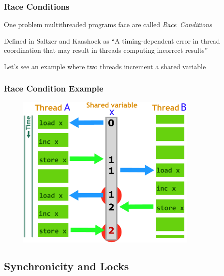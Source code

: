 \documentclass{beamer}
\newcommand{\linespace}{\vskip 0.25cm}
\begin{document}
\begin{frame}
\frametitle{Race Conditions}

One problem multithreaded programs face are called \emph{Race~Conditions}

\linespace

Defined in Saltzer and Kaashoek as ``A timing-dependent error in thread coordination that may result in threads computing incorrect results'' 

\linespace

Let's see an example where two threads increment a shared variable
\end{frame}

\begin{frame}
\frametitle{Race Condition Example}
	\begin{figure}
		\includegraphics[width=0.8\textwidth]{Illustrations/RaceCondition}
		\label{fig:racecondition}
	\end{figure}

\end{frame}

\subsection[Locks]{Synchronicity and Locks}
\end{document}
